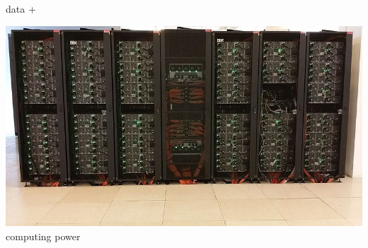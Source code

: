 \documentclass[12pt]{beamer}
\begin{document}
\begin{frame}
\begin{minipage}[b]{0.2\textwidth}
data + 
\end{minipage} 
\begin{minipage}[b]{0.2\textwidth}
\centering
\includegraphics[width=\textwidth]{Figures/supercomputer.jpg} \\
computing power 
\end{minipage} 
\end{frame}
\fi
\end{document}
